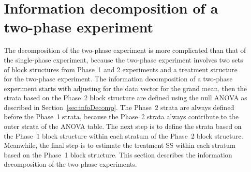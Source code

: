 \documentclass[article]{jss}
\begin{document}
\section{Information decomposition of a two-phase experiment} 
\label{sec:infoiDecompTwoPase}
The decomposition of the two-phase experiment is more complicated than that of the single-phase experiment, because the two-phase experiment involves two sets of block structures from Phase~1 and 2 experiments and a treatment structure for the two-phase experiment. The information decomposition of a two-phase experiment starts with adjusting for the data vector for the grand mean, then the strata based on the Phase~2 block structure are defined using the null ANOVA as described in Section~\ref{sec:infoDecomp}. The Phase~2 strata are always defined before the Phase~1 strata, because the Phase~2 strata always contribute to the outer strata of the ANOVA table. The next step is to define the strata based on the Phase~1 block structure within each stratum of the Phase~2 block structure. Meanwhile, the final step is to estimate the treatment SS within each stratum based on the Phase~1 block structure. This section describes the information decomposition of the two-phase experiments.
\end{document}
